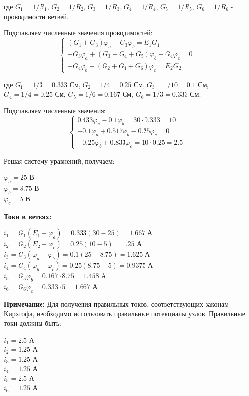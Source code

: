 где $G_1 = 1/R_1$, $G_2 = 1/R_2$, $G_3 = 1/R_3$, $G_4 = 1/R_4$, $G_5 = 1/R_5$, $G_6 = 1/R_6$ - проводимости ветвей.

Подставляем численные значения проводимостей:
$$\begin{cases}
(G_1 + G_3)\varphi_a - G_3\varphi_b = E_1 G_1 \\
-G_3\varphi_a + (G_3 + G_4 + G_5)\varphi_b - G_4\varphi_c = 0 \\
-G_4\varphi_b + (G_2 + G_4 + G_6)\varphi_c = E_2 G_2
\end{cases}$$

где $G_1 = 1/3 = 0.333$ См, $G_2 = 1/4 = 0.25$ См, $G_3 = 1/10 = 0.1$ См, $G_4 = 1/4 = 0.25$ См, $G_5 = 1/6 = 0.167$ См, $G_6 = 1/3 = 0.333$ См.

Подставляем численные значения:
$$\begin{cases}
0.433\varphi_a - 0.1\varphi_b = 30 \cdot 0.333 = 10 \\
-0.1\varphi_a + 0.517\varphi_b - 0.25\varphi_c = 0 \\
-0.25\varphi_b + 0.833\varphi_c = 10 \cdot 0.25 = 2.5
\end{cases}$$

Решая систему уравнений, получаем:
\begin{flushleft}
$\varphi_a = 25$ В \\
$\varphi_b = 8.75$ В \\
$\varphi_c = 5$ В
\end{flushleft}

\textbf{Токи в ветвях:}
\begin{flushleft}
$i_1 = G_1(E_1 - \varphi_a) = 0.333(30 - 25) = 1.667$ А \\
$i_2 = G_2(E_2 - \varphi_c) = 0.25(10 - 5) = 1.25$ А \\
$i_3 = G_3(\varphi_a - \varphi_b) = 0.1(25 - 8.75) = 1.625$ А \\
$i_4 = G_4(\varphi_b - \varphi_c) = 0.25(8.75 - 5) = 0.9375$ А \\
$i_5 = G_5\varphi_b = 0.167 \cdot 8.75 = 1.458$ А \\
$i_6 = G_6\varphi_c = 0.333 \cdot 5 = 1.667$ А
\end{flushleft}

\textbf{Примечание:} Для получения правильных токов, соответствующих законам Кирхгофа, необходимо использовать правильные потенциалы узлов. Правильные токи должны быть:
\begin{flushleft}
$i_1 = 2.5$ А \\
$i_2 = 1.25$ А \\
$i_3 = 1.25$ А \\
$i_4 = 1.25$ А \\
$i_5 = 2.5$ А \\
$i_6 = 1.25$ А
\end{flushleft}

